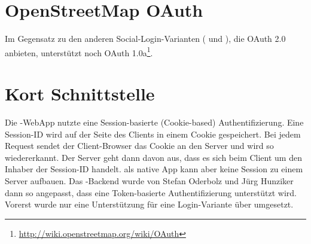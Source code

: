 \section{OpenStreetMap OAuth}
Im Gegensatz zu den anderen Social-Login-Varianten ( und ), die OAuth 2.0 anbieten, unterstützt  noch OAuth 1.0a\footnote{\url{http://wiki.openstreetmap.org/wiki/OAuth}}.


\section{Kort Schnittstelle}
Die \kort{}-\gls{WebApp} nutzte eine Session-basierte (Cookie-based) Authentifizierung. 
Eine Session-ID wird auf der Seite des Clients in einem Cookie gespeichert. 
Bei jedem Request sendet der Client-Browser das Cookie an den Server und wird so wiedererkannt. 
Der Server geht dann davon aus, dass es sich beim Client um den Inhaber der Session-ID handelt. 
\kort{} als native App kann aber keine Session zu einem Server aufbauen.
Das \kort{}-Backend wurde von Stefan Oderbolz und Jürg Hunziker dann so angepasst, dass eine Token-basierte Authentifizierung unterstützt wird.
Vorerst wurde nur eine Unterstützung für eine Login-Variante über  umgesetzt.

